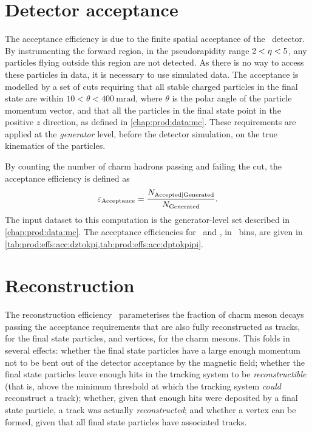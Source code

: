 \section{Detector acceptance}
\label{chap:prod:effs:acc}

The acceptance efficiency is due to the finite spatial acceptance of the \lhcb\ 
detector.
By instrumenting the forward region, in the pseudorapidity range $2 < \eta < 
5$, any particles flying outside this region are not detected.
As there is no way to access these particles in data, it is necessary to use 
simulated data.
The acceptance is modelled by a set of cuts requiring that all stable charged 
particles in the final state are within $10 < \theta < 
\SI{400}{\milli\radian}$, where $\theta$ is the polar angle of the particle 
momentum vector, and that all the particles in the final state point in the 
positive $z$ direction, as defined in \cref{chap:prod:data:mc}.
These requirements are applied at the \emph{generator} level, before the 
detector simulation, on the true kinematics of the particles.

By counting the number of charm hadrons passing and failing the cut, the 
acceptance efficiency is defined as
\begin{equation}
  \effacc = \frac{%
    N_{\text{Accepted}|\text{Generated}}
  }
  {%
    N_{\text{\text{Generated}}}
  }.
  \label{eqn:prod:effs:acc}
\end{equation}
The input dataset to this computation is the generator-level set described in 
\cref{chap:prod:data:mc}.
The acceptance efficiencies for \DzToKpi\ and \DpToKpipi, in \pTy\ bins, are 
given in \cref{tab:prod:effs:acc:dztokpi,tab:prod:effs:acc:dptokpipi}.

\section{Reconstruction}
\label{chap:prod:effs:reco}

The reconstruction efficiency \effreco\ parameterises the fraction of charm 
meson decays passing the acceptance requirements that are also fully 
reconstructed as tracks, for the final state particles, and vertices, for the 
charm mesons.
This folds in several effects: whether the final state particles have a large 
enough momentum not to be bent out of the detector acceptance by the magnetic 
field; whether the final state particles leave enough hits in the tracking 
system to be \emph{reconstructible} (that is, above the minimum threshold at 
which the tracking system \emph{could} reconstruct a track); whether, given 
that enough hits were deposited by a final state particle, a track was actually 
\emph{reconstructed}; and whether a vertex can be formed, given that all final 
state particles have associated tracks.

